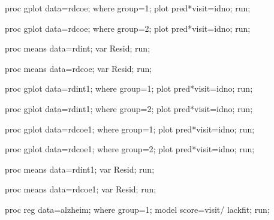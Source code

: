 \documentclass[letterpaper, 12pt]{article}
\begin{document}
\begin{Sascode}[store=class]
proc gplot data=rdcoe;
where group=1;
plot pred*visit=idno;
run;

proc gplot data=rdcoe;
where group=2;
plot pred*visit=idno;
run;

proc means data=rdint;
var Resid;
run;

proc means data=rdcoe;
var Resid;
run;

proc gplot data=rdint1;
where group=1;
plot pred*visit=idno;
run;

proc gplot data=rdint1;
where group=2;
plot pred*visit=idno;
run;

proc gplot data=rdcoe1;
where group=1;
plot pred*visit=idno;
run;

proc gplot data=rdcoe1;
where group=2;
plot pred*visit=idno;
run;

proc means data=rdint1;
var Resid;
run;

proc means data=rdcoe1;
var Resid;
run;

proc reg data=alzheim;
where group=1;
model score=visit/ lackfit;
run;
\end{Sascode}



\end{document}
